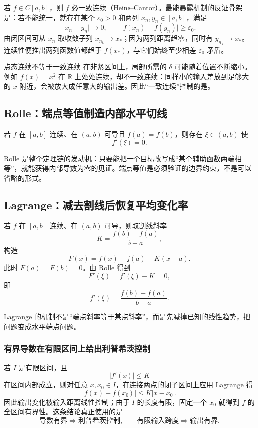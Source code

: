 \documentclass[UTF8,fontset=none,11pt,a4paper]{ctexart}
\begin{document}
若 $f\in C[a,b]$，则 $f$ 必一致连续（Heine--Cantor）。最能暴露机制的反证骨架是：若不能统一，就存在某个 $\varepsilon_0>0$ 和两列 $x_n,y_n\in[a,b]$，满足
\[
\lvert x_n-y_n\rvert\to0,
\qquad
\lvert f(x_n)-f(y_n)\rvert\ge\varepsilon_0.
\]
由闭区间可从 $x_n$ 取收敛子列 $x_{n_k}\to x_*$；因为两列距离趋零，同时有 $y_{n_k}\to x_*$。连续性便推出两列函数值都趋于 $f(x_*)$，与它们始终至少相差 $\varepsilon_0$ 矛盾。

\begin{warnbox}{点态连续不等于一致连续}
在非紧区间上，局部所需的 $\delta$ 可能随着位置不断缩小。例如 $f(x)=x^2$ 在 $\mathbb R$ 上处处连续，却不一致连续：同样小的输入差放到足够大的 $x$ 附近，会被放大成任意大的输出差。因此“一致连续”控制的是。
\end{warnbox}

\subsection{Rolle：端点等值制造内部水平切线}

若 $f$ 在 $[a,b]$ 连续、在 $(a,b)$ 可导且 $f(a)=f(b)$，则存在 $\xi\in(a,b)$ 使
\[
f'(\xi)=0.
\]

Rolle 是整个定理链的发动机：只要能把一个目标改写成“某个辅助函数两端相等”，就能获得内部导数为零的见证。端点等值是必须验证的边界约束，不是可以省略的形式。

\subsection{Lagrange：减去割线后恢复平均变化率}

若 $f$ 在 $[a,b]$ 连续、在 $(a,b)$ 可导，则取割线斜率
\[
K=\frac{f(b)-f(a)}{b-a},
\]
构造
\[
F(x)=f(x)-f(a)-K(x-a).
\]
此时 $F(a)=F(b)=0$。由 Rolle 得到
\[
F'(\xi)=f'(\xi)-K=0,
\]
即
\[
\boxed{f'(\xi)=\frac{f(b)-f(a)}{b-a}}.
\]

Lagrange 的机制不是“端点斜率等于某点斜率”，而是先减掉已知的线性趋势，把问题变成水平端点问题。

\subsubsection{有界导数在有限区间上给出利普希茨控制}
若 $I$ 是有限区间，且
\[
\lvert f'(x)\rvert\le K
\]
在区间内部成立，则对任意 $x,x_0\in I$，在连接两点的闭子区间上应用 Lagrange 得
\[
\lvert f(x)-f(x_0)\rvert\le K\lvert x-x_0\rvert.
\]
因此输出变化被输入距离线性控制；由于 $I$ 的长度有限，固定一个 $x_0$ 就得到 $f$ 的全区间有界性。这条结论真正使用的是
\[
\boxed{\text{导数有界}\Rightarrow\text{利普希茨控制},\qquad \text{有限输入跨度}\Rightarrow\text{输出有界}.}
\]
\end{document}
